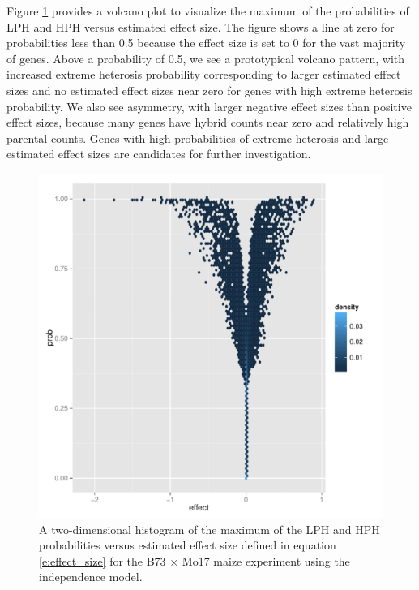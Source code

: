 \documentclass[useAMS,usenatbib,referee]{biom}
\begin{document}
Figure \ref{f:volcano} provides a volcano plot to visualize the maximum of the probabilities of LPH and HPH versus estimated effect size. The figure shows a line at zero for probabilities less than 0.5 because the effect size is set to 0 for the vast majority of genes. Above a probability of 0.5, we see a prototypical volcano pattern, with increased extreme heterosis probability corresponding to larger estimated effect sizes and no estimated effect sizes near zero for genes with high extreme heterosis probability. We also see asymmetry, with larger negative effect sizes than positive effect sizes, because many genes have hybrid counts near zero and relatively high parental counts. Genes with high probabilities of extreme heterosis and large estimated effect sizes are candidates for further investigation.


\begin{figure}
\centerline{\includegraphics[width=\textwidth]{volcano}}
\caption{A two-dimensional histogram of the maximum of the LPH and HPH probabilities versus estimated effect size defined in equation \ref{e:effect_size} for the B73 $\times$ Mo17 maize experiment using the independence model.}
\label{f:volcano}
\end{figure}
\end{document}

